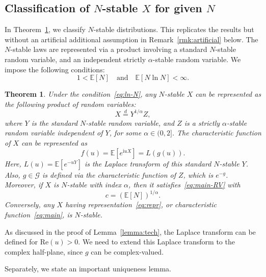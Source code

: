 \documentclass[12pt]{amsart}
\newtheorem{theorem}{Theorem}[section]
\theoremstyle{remark}
\theoremstyle{definition}
\begin{document}
\subsection{Classification of $N$-stable $X$ for given $N$} In Theorem~\ref{thm:repr}, we classify $N$-stable distributions. This replicates the results \cite[Proposition 2.1, Proposition 3.1]{Anna} but without an artificial additional assumption in Remark~\ref{rmk:artificial} below. The $N$-stable laws are represented via a product involving a standard $N$-stable random variable, and an independent strictly $\alpha$-stable random variable. We impose the following conditions:
\begin{equation}
\label{eq:ln-N}
1 < \mathbb E[N]\quad \mbox{and}\quad \mathbb E[N\ln N] < \infty.
\end{equation}

\begin{theorem}
\label{thm:repr} Under the condition~\eqref{eq:ln-N}, any $N$-stable $X$ can be represented as the following product of random variables:
\begin{equation}
\label{eq:repr}
X \stackrel{d}{=} Y^{1/\alpha}Z,
\end{equation}
where $Y$ is the standard $N$-stable random variable, and $Z$ is a strictly $\alpha$-stable random variable independent of $Y$, for some $\alpha \in (0, 2]$. The characteristic function of $X$ can be represented as 
\begin{equation}
\label{eq:main}
f(u) = \mathbb E\left[e^{\mathrm{i}uX}\right] = L(g(u)).
\end{equation}
Here, $L(u) = \mathbb E[e^{-uY}]$ is the Laplace transform of this standard $N$-stable $Y$. Also, $g \in \mathcal G$ is defined via the characteristic function of $Z$, which is $e^{-g}$. Moreover, if $X$ is $N$-stable with index $\alpha$, then it satisfies~\eqref{eq:main-RV} with 
\begin{equation}
\label{eq:c}
c = (\mathbb E[N])^{1/\alpha}.
\end{equation}
Conversely, any $X$ having representation~\eqref{eq:repr}, or characteristic function~\eqref{eq:main}, is $N$-stable. 
\end{theorem} 

As discussed in the proof of Lemma~\ref{lemma:tech}, the Laplace transform can be defined for $\mathrm{Re}(u) > 0$. We need to extend this Laplace transform to the complex half-plane, since $g$ can be complex-valued.

Separately, we state an important uniqueness lemma.
\end{document}
